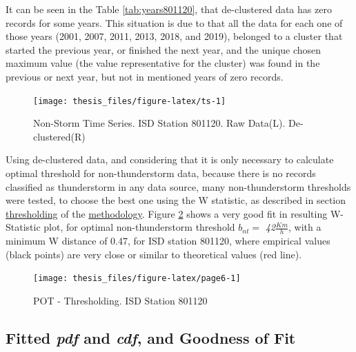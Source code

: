 \documentclass[12pt,oneside]{reedthesis}
\begin{document}
It can be seen in the Table \ref{tab:years801120}, that de-clustered data has zero records for some years. This situation is due to that all the data for each one of those years (2001, 2007, 2011, 2013, 2018, and 2019), belonged to a cluster that started the previous year, or finished the next year, and the unique chosen maximum value (the value representative for the cluster) was found in the previous or next year, but not in mentioned years of zero records.
\begin{figure}

{\centering \texttt{[image: thesis\_files/figure-latex/ts-1]} 

}

\caption{Non-Storm Time Series. ISD Station 801120. Raw Data(L). De-clustered(R)}\label{fig:ts}
\end{figure}
Using de-clustered data, and considering that it is only necessary to calculate optimal threshold for non-thunderstorm data, because there is no records classified as thunderstorm in any data source, many non-thunderstorm thresholds were tested, to choose the best one using the W statistic, as described in section \protect\hyperlink{thresholding}{thresholding} of the \protect\hyperlink{rmd-method}{methodology}. Figure \ref{fig:page6} shows a very good fit in resulting W-Statistic plot, for optimal non-thunderstorm threshold \(b_{nt} =\) \emph{42}\(\frac{Km}{h}\), with a minimum W distance of 0.47, for ISD station 801120, where empirical values (black points) are very close or similar to theoretical values (red line).

\footnotesize
\begin{figure}

{\centering \texttt{[image: thesis\_files/figure-latex/page6-1]} 

}

\caption{POT - Thresholding. ISD Station 801120}\label{fig:page6}
\end{figure}
\normalsize

\hypertarget{fitted-pdf-and-cdf-and-goodness-of-fit}{%
\subsection{\texorpdfstring{Fitted \emph{pdf} and \emph{cdf}, and Goodness of Fit}{Fitted pdf and cdf, and Goodness of Fit}}\label{fitted-pdf-and-cdf-and-goodness-of-fit}}
\end{document}
